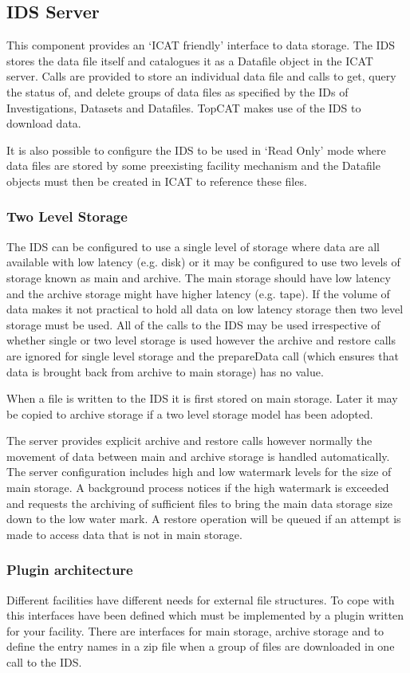 \documentclass[a4paper]{jpconf}
\begin{document}
\subsection{IDS Server}
This component provides an `ICAT friendly' interface to data
storage. The IDS stores the data file itself and catalogues it as a
Datafile object in the ICAT server. Calls are provided to store an
individual data file and calls to get, query the status of, and delete
groups of data files as specified by the IDs of Investigations,
Datasets and Datafiles. TopCAT makes use of the IDS to download data.

It is also possible to configure the IDS to be used in `Read Only'
mode where data files are stored by some preexisting facility
mechanism and the Datafile objects must then be created in ICAT to
reference these files. 

\subsubsection{Two Level Storage}
The IDS can be configured to use a single level of storage where data
are all available with low latency (e.g. disk) or it may be
configured to use two levels of storage known as main and archive. The
main storage should have low latency and the archive storage might have
higher latency (e.g. tape). If the volume of data makes it not
practical to hold all data on low latency storage then two level
storage must be used. All of the calls to the IDS may be used
irrespective of whether single or two level storage is used however
the archive and restore calls are ignored for single level storage and
the prepareData call (which ensures that data is brought back from
archive to main storage) has no value.

When a file is written to the IDS it is first stored on main
storage. Later it may be copied to archive storage if a two level
storage model has been adopted.

The server provides explicit archive and restore calls however
normally the movement of data between main and archive storage is
handled automatically. The server configuration includes high and low
watermark levels for the size of main storage. A background process
notices if the high watermark is exceeded and requests the archiving
of sufficient files to bring the main data storage size down to the
low water mark. A restore operation will be queued if an attempt is
made to access data that is not in main storage.

\subsubsection{Plugin architecture}
Different facilities have different needs for external file
structures. To cope with this interfaces have been defined which must
be implemented by a plugin written for your facility. There are
interfaces for main storage, archive storage and to define the entry
names in a zip file when a group of files are downloaded in one call
to the IDS.
\end{document}
